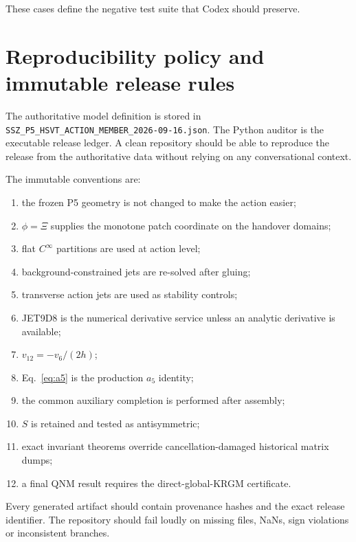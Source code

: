 \documentclass[11pt,a4paper,oneside]{book}
\begin{document}
These cases define the negative test suite that Codex should preserve.

\chapter{Reproducibility policy and immutable release rules}
The authoritative model definition is stored in \texttt{SSZ\_P5\_HSVT\_ACTION\_MEMBER\_2026-09-16.json}. The Python auditor is the executable release ledger. A clean repository should be able to reproduce the release from the authoritative data without relying on any conversational context.

The immutable conventions are:
\begin{enumerate}
\item the frozen P5 geometry is not changed to make the action easier;
\item $\phi=\Xi$ supplies the monotone patch coordinate on the handover domains;
\item flat $C^\infty$ partitions are used at action level;
\item background-constrained jets are re-solved after gluing;
\item transverse action jets are used as stability controls;
\item JET9D8 is the numerical derivative service unless an analytic derivative is available;
\item $v_{12}=-v_6/(2h)$;
\item Eq.~\eqref{eq:a5} is the production $a_5$ identity;
\item the common auxiliary completion is performed after assembly;
\item $S$ is retained and tested as antisymmetric;
\item exact invariant theorems override cancellation-damaged historical matrix dumps;
\item a final QNM result requires the direct-global-KRGM certificate.
\end{enumerate}

Every generated artifact should contain provenance hashes and the exact release identifier. The repository should fail loudly on missing files, NaNs, sign violations or inconsistent branches.
\end{document}
